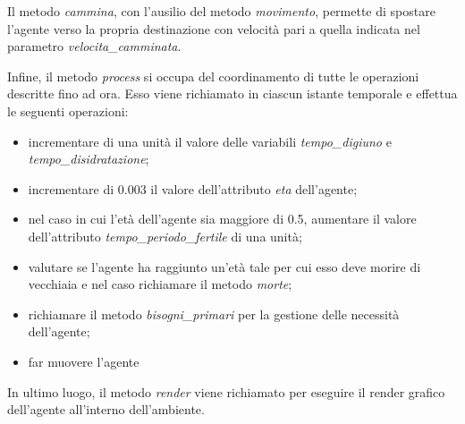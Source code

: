 \documentclass[11pt]{article}
\begin{document}
Il metodo \emph{cammina}, con l'ausilio del metodo \emph{movimento}, permette di spostare l'agente verso la propria destinazione con velocità pari a quella indicata nel parametro \emph{velocita\_camminata}. 

Infine, il metodo \emph{process} si occupa del coordinamento di tutte le operazioni descritte fino ad ora. Esso viene richiamato in ciascun istante temporale e effettua le seguenti operazioni:
\begin{itemize}
    \item incrementare di una unità il valore delle variabili \emph{tempo\_digiuno} e \emph{tempo\_disidratazione};
    \item incrementare di 0.003 il valore dell'attributo \emph{eta} dell'agente;
    \item nel caso in cui l'età dell'agente sia maggiore di 0.5, aumentare il valore dell'attributo \emph{tempo\_periodo\_fertile} di una unità;
    \item valutare se l'agente ha raggiunto un'età tale per cui esso deve morire di vecchiaia e nel caso richiamare il metodo \emph{morte};
    \item richiamare il metodo \emph{bisogni\_primari} per la gestione delle necessità dell'agente;
    \item far muovere l'agente
\end{itemize}

In ultimo luogo, il metodo \emph{render} viene richiamato per eseguire il render grafico dell'agente all'interno dell'ambiente.
\end{document}
